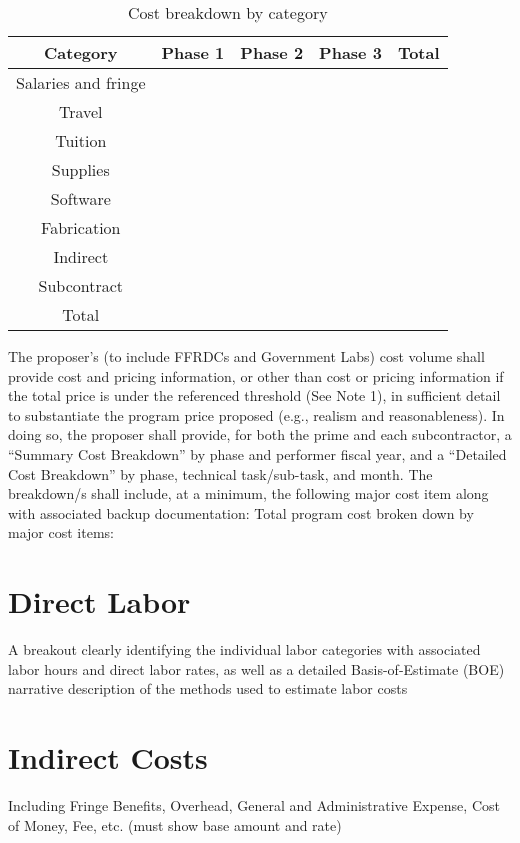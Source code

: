 \begin{table}[h!]
  \centering
  \begin{tabular}{|c||c|c|c|c|}
    \hline
    Category & Phase 1 & Phase 2 & Phase 3 & Total\\
    \hline
    \hline
    Salaries and fringe & & & & \\
    \hline
    Travel & & & & \\
    \hline
    Tuition & & & & \\
    \hline
    Supplies & & & & \\
    \hline
    Software & & & & \\
    \hline
    Fabrication & & & & \\
    \hline
    Indirect & & & & \\
    \hline
    Subcontract & & & & \\
    \hline
    Total & & & & \\
    \hline
  \end{tabular}
  \caption{Cost breakdown by category}
  \label{tab:catcost}
\end{table}
\iffalse
{}
The proposer’s (to include FFRDCs and Government Labs) cost volume shall provide cost and
pricing information, or other than cost or pricing information if the total price is under the
referenced threshold (See Note 1), in sufficient detail to substantiate the program price proposed
(e.g., realism and reasonableness). In doing so, the proposer shall provide, for both the prime
and each subcontractor, a “Summary Cost Breakdown” by phase and performer fiscal year,
and a “Detailed Cost Breakdown” by phase, technical task/sub-task, and month. The
breakdown/s shall include, at a minimum, the following major cost item along with associated
backup documentation:
Total program cost broken down by major cost items:

\section{Direct Labor}
A breakout clearly identifying the individual labor categories with associated labor hours and
direct labor rates, as well as a detailed Basis-of-Estimate (BOE) narrative description of the
methods used to estimate labor costs
\section{Indirect Costs}
Including Fringe Benefits, Overhead, General and Administrative Expense, Cost of Money,
Fee, etc. (must show base amount and rate)
